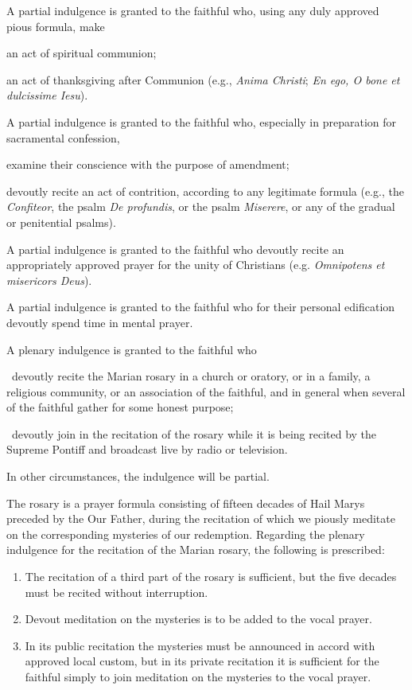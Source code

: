 \documentclass[12pt]{article}
\newcommand{\foreign}[1]{\textsl{#1}}
\begin{document}
 A partial indulgence is granted to the faithful who, using any duly approved pious formula, make

 an act of spiritual communion;

 an act of thanksgiving after Communion (e.g., \foreign{Anima Christi}; \foreign{En ego, O bone et dulcissime Iesu}).

\hypertarget{grant9}{}
A partial indulgence is granted to the faithful who, especially in preparation for sacramental confession,

 examine their conscience with the purpose of amendment;

 devoutly recite an act of contrition, according to any legitimate formula (e.g., the \foreign{Confiteor}, the psalm \foreign{De profundis}, or the psalm \foreign{Miserere}, or any of the gradual or penitential psalms).

\hypertarget{grant11}{}
 A partial indulgence is granted to the faithful who devoutly recite an appropriately approved prayer for the unity of Christians (e.g. \foreign{Omnipotens et misericors Deus}).

A partial indulgence is granted to the faithful who for their personal edification devoutly spend time in mental prayer.

\hypertarget{grant17}{}
 A plenary indulgence is granted to the faithful who

 devoutly recite the Marian rosary in a church or oratory, or in a family, a religious community, or an association of the faithful, and in general when several of the faithful gather for some honest purpose;

 devoutly join in the recitation of the rosary while it is being recited by the Supreme Pontiff and broadcast live by radio or television.

In other circumstances, the indulgence will be partial.

The rosary is a prayer formula consisting of fifteen decades of Hail Marys preceded by the Our Father, during the recitation of which we piously meditate on the corresponding mysteries of our redemption.
Regarding the plenary indulgence for the recitation of the Marian rosary, the following is prescribed:
\begin{enumerate}
	\item The recitation of a third part of the rosary is sufficient, but the five decades must be recited without interruption.
	\item Devout meditation on the mysteries is to be added to the vocal prayer.
	\item In its public recitation the mysteries must be announced in accord with approved local custom, but in its private recitation it is sufficient for the faithful simply to join meditation on the mysteries to the vocal prayer.
\end{enumerate}
\end{document}
